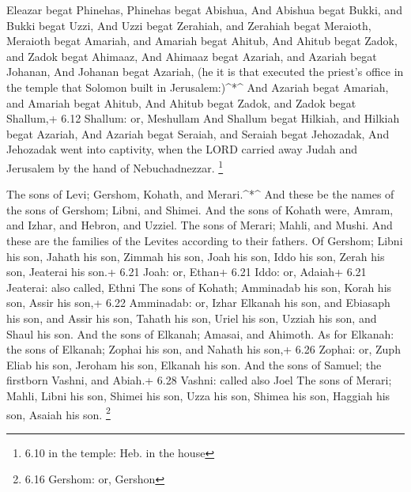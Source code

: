  Eleazar begat Phinehas, Phinehas begat Abishua,
 And Abishua begat Bukki, and Bukki begat Uzzi, 
And Uzzi begat Zerahiah, and Zerahiah begat Meraioth, 
Meraioth begat Amariah, and Amariah begat Ahitub,  And
Ahitub begat Zadok, and Zadok begat Ahimaaz,  And Ahimaaz
begat Azariah, and Azariah begat Johanan,  And Johanan
begat Azariah, (he it is that executed the priest's office in the temple
that Solomon built in Jerusalem:)\^{}*\^{}  And Azariah
begat Amariah, and Amariah begat Ahitub,  And Ahitub begat
Zadok, and Zadok begat Shallum,+ 6.12 Shallum: or, Meshullam
 And Shallum begat Hilkiah, and Hilkiah begat Azariah,
 And Azariah begat Seraiah, and Seraiah begat Jehozadak,
 And Jehozadak went into captivity, when the LORD carried
away Judah and Jerusalem by the hand of Nebuchadnezzar. \footnote{6.10
  in the temple: Heb. in the house}

 The sons of Levi; Gershom, Kohath, and Merari.\^{}*\^{}
 And these be the names of the sons of Gershom; Libni, and
Shimei.  And the sons of Kohath were, Amram, and Izhar, and
Hebron, and Uzziel.  The sons of Merari; Mahli, and Mushi.
And these are the families of the Levites according to their fathers.
 Of Gershom; Libni his son, Jahath his son, Zimmah his son,
 Joah his son, Iddo his son, Zerah his son, Jeaterai his
son.+ 6.21 Joah: or, Ethan+ 6.21 Iddo: or, Adaiah+ 6.21 Jeaterai: also
called, Ethni  The sons of Kohath; Amminadab his son, Korah
his son, Assir his son,+ 6.22 Amminadab: or, Izhar  Elkanah
his son, and Ebiasaph his son, and Assir his son,  Tahath
his son, Uriel his son, Uzziah his son, and Shaul his son. 
And the sons of Elkanah; Amasai, and Ahimoth.  As for
Elkanah: the sons of Elkanah; Zophai his son, and Nahath his son,+ 6.26
Zophai: or, Zuph  Eliab his son, Jeroham his son, Elkanah
his son.  And the sons of Samuel; the firstborn Vashni, and
Abiah.+ 6.28 Vashni: called also Joel  The sons of Merari;
Mahli, Libni his son, Shimei his son, Uzza his son,  Shimea
his son, Haggiah his son, Asaiah his son. \footnote{6.16 Gershom: or,
  Gershon}

